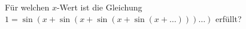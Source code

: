 \item
Für welchen $x$-Wert ist die Gleichung $1=\sin (x+\sin(x+\sin(x+\sin(x+\ldots)))\ldots)$ erfüllt?

